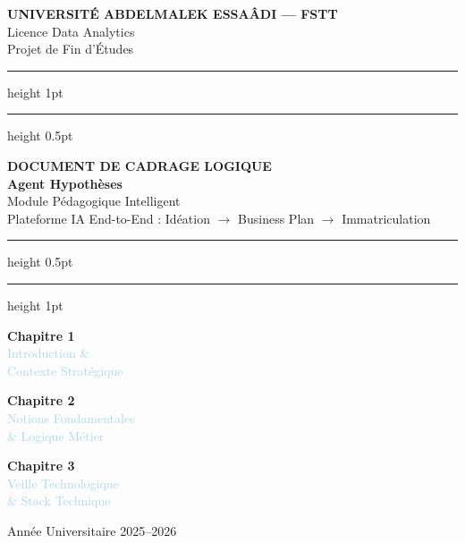 \documentclass[11pt, a4paper]{article}
\begin{document}
\begin{titlepage}
\pagecolor{navyblue}
\color{white}
\begin{center}

\vspace*{1.5cm}

{\small\bfseries\color{lightblue} UNIVERSITÉ ABDELMALEK ESSAÂDI — FSTT}\\[4pt]
{\small\color{lightblue} Licence Data Analytics}\\[6pt]
{\small\color{lightblue} Projet de Fin d'Études}

\vspace{1.2cm}
\textcolor{midblue}{\hrule height 1pt}
\vspace{0.3cm}
\textcolor{rulegray}{\hrule height 0.5pt}
\vspace{1.2cm}

{\fontsize{13}{18}\selectfont\bfseries\color{lightblue}
DOCUMENT DE CADRAGE LOGIQUE}\\[10pt]

{\fontsize{26}{34}\selectfont\bfseries\color{white}
Agent Hypothèses}\\[14pt]

{\fontsize{14}{20}\selectfont\color{lightblue}
Module Pédagogique Intelligent}\\[6pt]

{\fontsize{11}{16}\selectfont\color{rulegray}
Plateforme IA End-to-End :
Idéation $\rightarrow$ Business Plan $\rightarrow$ Immatriculation}

\vspace{1.2cm}
\textcolor{rulegray}{\hrule height 0.5pt}
\vspace{0.3cm}
\textcolor{midblue}{\hrule height 1pt}
\vspace{1.8cm}

\begin{minipage}{0.3\textwidth}
\centering
\textcolor{midblue}{\large\bfseries Chapitre 1}\\[4pt]
\textcolor{lightblue}{\small Introduction \&\\Contexte Stratégique}
\end{minipage}
\hfill
\begin{minipage}{0.3\textwidth}
\centering
\textcolor{midblue}{\large\bfseries Chapitre 2}\\[4pt]
\textcolor{lightblue}{\small Notions Fondamentales\\\& Logique Métier}
\end{minipage}
\hfill
\begin{minipage}{0.3\textwidth}
\centering
\textcolor{midblue}{\large\bfseries Chapitre 3}\\[4pt]
\textcolor{lightblue}{\small Veille Technologique\\\& Stack Technique}
\end{minipage}

\vfill

{\small\color{rulegray} Année Universitaire 2025--2026}

\end{center}
\end{titlepage}
\end{document}
